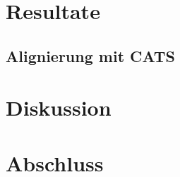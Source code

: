 \documentclass[11pt]{article}
\begin{document}
\section{Resultate}
\subsection{Alignierung mit CATS}
\section{Diskussion}
\section{Abschluss}










\cite{*}



\end{document}
